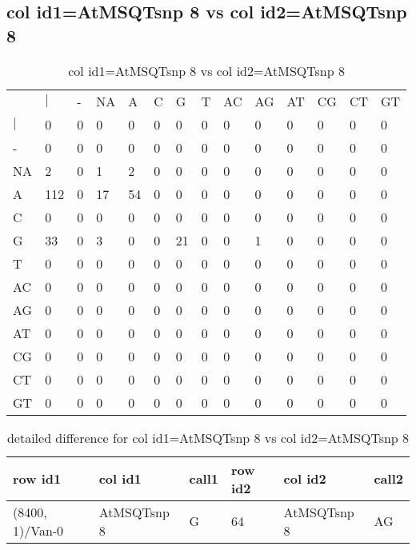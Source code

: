 \subsection{col id1=AtMSQTsnp 8 vs col id2=AtMSQTsnp 8}
\begin{center}
\begin{longtable}{|l|l|l|l|l|l|l|l|l|l|l|l|l|l|}
\caption{col id1=AtMSQTsnp 8 vs col id2=AtMSQTsnp 8} \label{table_dm774}\\
\hline
\\
\hline
&$|$&-&NA&A&C&G&T&AC&AG&AT&CG&CT&GT\\
$|$&0&0&0&0&0&0&0&0&0&0&0&0&0\\
-&0&0&0&0&0&0&0&0&0&0&0&0&0\\
NA&2&0&1&2&0&0&0&0&0&0&0&0&0\\
A&112&0&17&54&0&0&0&0&0&0&0&0&0\\
C&0&0&0&0&0&0&0&0&0&0&0&0&0\\
G&33&0&3&0&0&21&0&0&1&0&0&0&0\\
T&0&0&0&0&0&0&0&0&0&0&0&0&0\\
AC&0&0&0&0&0&0&0&0&0&0&0&0&0\\
AG&0&0&0&0&0&0&0&0&0&0&0&0&0\\
AT&0&0&0&0&0&0&0&0&0&0&0&0&0\\
CG&0&0&0&0&0&0&0&0&0&0&0&0&0\\
CT&0&0&0&0&0&0&0&0&0&0&0&0&0\\
GT&0&0&0&0&0&0&0&0&0&0&0&0&0\\
\hline
\end{longtable}
\end{center}

\begin{center}
\begin{longtable}{|l|l|l|l|l|l|}
\caption{detailed difference for col id1=AtMSQTsnp 8 vs col id2=AtMSQTsnp 8} \label{table_dm775}\\
\hline
row id1&col id1&call1&row id2&col id2&call2\\
\hline
(8400, 1)/Van-0&AtMSQTsnp 8&G&64&AtMSQTsnp 8&AG\\
\hline
\end{longtable}
\end{center}

